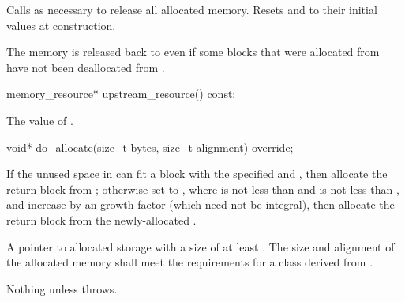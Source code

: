 \begin{itemdescr}
\pnum
\effects
Calls  as necessary
to release all allocated memory.
Resets  and 
to their initial values at construction.

\pnum
\begin{note}
The memory is released back to 
even if some blocks that were allocated from 
have not been deallocated from .
\end{note}
\end{itemdescr}

%
\begin{itemdecl}
memory_resource* upstream_resource() const;
\end{itemdecl}

\begin{itemdescr}
\pnum
\returns
The value of .
\end{itemdescr}

%
\begin{itemdecl}
void* do_allocate(size_t bytes, size_t alignment) override;
\end{itemdecl}

\begin{itemdescr}
\pnum
\effects
If the unused space in 
can fit a block with the specified  and ,
then allocate the return block from ;
otherwise set  to ,
where  is not less than  and
 is not less than ,
and increase 
by an  growth factor (which need not be integral),
then allocate the return block from the newly-allocated .

\pnum
\returns
A pointer to allocated storage
with a size of at least .
The size and alignment of the allocated memory shall meet the requirements
for a class derived from .

\pnum
\throws
Nothing unless  throws.
\end{itemdescr}


